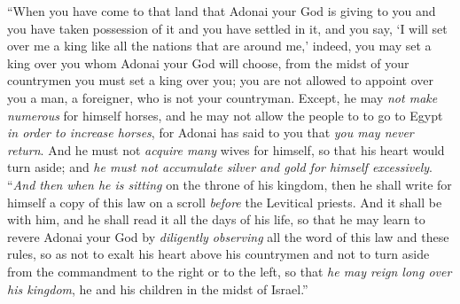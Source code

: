 \begin{biblechapter}
\verse “When you have come to that land that Adonai your God is giving to you and you have taken possession of it and you have settled in it, and you say, ‘I will set over me a king like all the nations that are around me,’
\verse indeed, you may set a king over you whom Adonai your God will choose, from the midst of your countrymen you must set a king over you; you are not allowed to appoint over you a man, a foreigner, who is not your countryman.
\verse Except, he may \textit{not make numerous} for himself horses, and he may not allow the people to to go to Egypt \textit{in order to increase horses}, for Adonai has said to you that \textit{you may never return}.
\verse And he must not \textit{acquire many} wives for himself, so that his heart would turn aside; and \textit{he must not accumulate silver and gold for himself excessively}.
\verse “\textit{And then} \textit{when he is sitting} on the throne of his kingdom, then he shall write for himself a copy of this law on a scroll \textit{before} the Levitical priests.
\verse And it shall be with him, and he shall read it all the days of his life, so that he may learn to revere Adonai your God by \textit{diligently observing} all the word of this law and these rules,
\verse so as not to exalt his heart above his countrymen and not to turn aside from the commandment to the right or to the left, so that \textit{he may reign long over his kingdom}, he and his children in the midst of Israel.”
\end{biblechapter}

